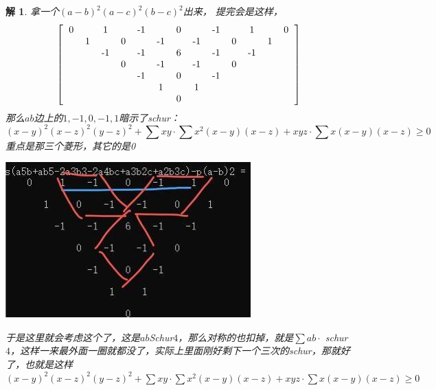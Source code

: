 \documentclass[UTF8]{ctexart}
\newtheorem{2}{解}
\begin{document}
\begin{2}

拿一个$ (a-b)^{2}(a-c)^{2}(b-c)^{2} $出来，
提完会是这样，
\renewcommand*{\arraystretch}{1.732}\[\left[\begin{matrix}
	\begin{tabular}{ccccccccccccc}
		0&  &1  &  & -1 &  & 0 &  & -1 &  & 1 &  & 0\\
		&1  &  & 0 &  & -1 &  & -1 &  & 0 &  & 1 & \\
		&  & -1 &  & -1 &  &  6&  &  -1&  &  -1&  & \\
		&  &  &  0 &  & -1 &  & -1 &  & 0  &  &  & \\
		&  &  &  &  -1&  &0  &  & -1 &  &  &  & \\
		&  &  &  &  &  1&  &1  &  &  &  &  & \\
		&  &  &  &  &  &  0&  &  &  &  &  & \\
	\end{tabular}
\end{matrix}\right]\]
那么$ ab $边上的$ 1,-1,0,-1,1 $暗示了schur：
$$ (x-y)^{2}(x-z)^{2}(y-z)^{2}+\displaystyle \sum x y \cdot \displaystyle \sum x^{2}(x-y)(x-z)+x y z \cdot \displaystyle \sum x(x-y)(x-z) \geq 0 $$
重点是那三个菱形，其它的是0
\begin{center}
	\includegraphics[width=0.5\linewidth]{17}
\end{center}

于是这里就会考虑这个了，这是$ab$Schur$4 $，那么对称的也扣掉，就是$ \displaystyle \sum ab·$ schur $4 $，这样一来最外面一圈就都没了，实际上里面刚好剩下一个三次的schur，那就好了，也就是这样
$ (x-y)^{2}(x-z)^{2}(y-z)^{2}+\displaystyle \sum x y \cdot \displaystyle \sum x^{2}(x-y)(x-z)+x y z \cdot \displaystyle \sum x(x-y)(x-z) \geq 0 $
\\
\end{2}
\end{document}
